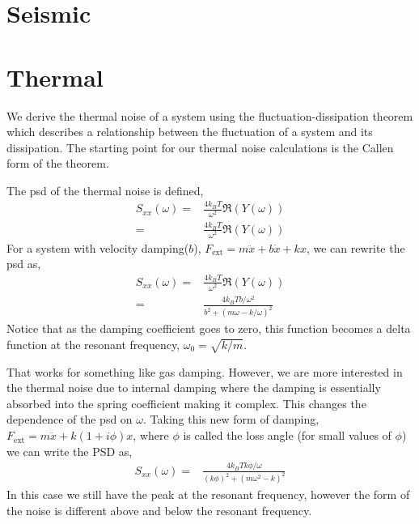 \section{Seismic}

\section{Thermal}

We derive the thermal noise of a system using the fluctuation-dissipation
theorem which describes a relationship between the fluctuation of a system
and its dissipation. The starting point for our thermal noise calculations
is the Callen form of the theorem. \cite{Saulson,Callen}

The \ac{psd} of the thermal noise is defined,
\begin{align}
S_{xx}(\omega) =& \frac{4 k_B T}{\omega^2} \Re (Y(\omega)) \\
    =& \frac{4 k_B T}{\omega^2} \Re (Y(\omega))
\end{align}
For a system with velocity damping($b$), $F_{\mathrm{ext}} = m\ddot{x} + b\dot{x} + kx$,
we can rewrite the \ac{psd} as,
\begin{align}
S_{xx}(\omega) =& \frac{4 k_B T}{\omega^2} \Re (Y(\omega)) \\
    =& \frac{4 k_B T b / \omega^2}{ b^2 + (m \omega - k/\omega)^2}
\end{align}
Notice that as the damping coefficient goes to zero, this function becomes a
delta function at the resonant frequency, $\omega_0 = \sqrt{k/m}$.

That works for something like gas damping. However, we are more interested in
the thermal noise due to internal damping where the damping is essentially
absorbed into the spring coefficient making it complex. This changes the
dependence of the \ac{psd} on $\omega$. Taking this new form of damping,
$F_{\mathrm{ext}} = m\ddot{x} + k(1+i\phi)x$, where $\phi$ is called the
loss angle (for small values of $\phi$) we can write the PSD as,
\begin{align}
S_{xx}(\omega) = & \frac{4 k_B T k \phi / \omega}{(k \phi)^2 +
    (m \omega^2 - k)^2}
\end{align}
In this case we still have the peak at the resonant frequency, however the form
of the noise is different above and below the resonant frequency.

